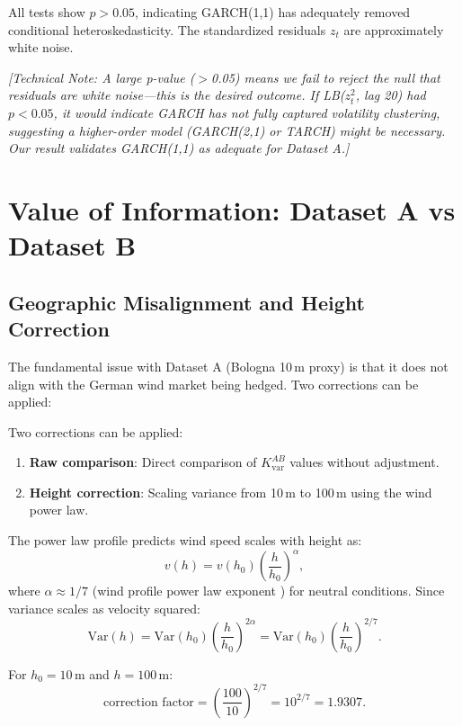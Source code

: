 \documentclass[11pt, a4paper, twoside]{article}
\begin{document}
All tests show $p > 0.05$, indicating GARCH(1,1) has adequately removed conditional heteroskedasticity. The standardized residuals $z_t$ are approximately white noise.

\textit{[Technical Note: A large p-value ($>$0.05) means we fail to reject the null that residuals are white noise---this is the desired outcome. If LB($z_t^2$, lag 20) had $p < 0.05$, it would indicate GARCH has not fully captured volatility clustering, suggesting a higher-order model (GARCH(2,1) or TARCH) might be necessary. Our result validates GARCH(1,1) as adequate for Dataset A.]}

\section{Value of Information: Dataset A vs Dataset B}

\subsection{Geographic Misalignment and Height Correction}

The fundamental issue with Dataset A (Bologna 10\,m proxy) is that it does not align with the German wind market being hedged. Two corrections can be applied:

Two corrections can be applied:

\begin{enumerate}
    \item \textbf{Raw comparison}: Direct comparison of
    $K_{\mathrm{var}}^{AB}$ values without adjustment.

    \item \textbf{Height correction}: Scaling variance from
    10\,m to 100\,m using the wind power law.
\end{enumerate}
The power law profile predicts wind speed scales with height as:
\begin{equation}
v(h) = v(h_0) \left( \frac{h}{h_0} \right)^{\alpha},
\end{equation}
where $\alpha \approx 1/7$ (wind profile power law exponent \citep{PetersonHennessey:1978}) for neutral conditions. Since variance scales as velocity squared:
\begin{equation}
\text{Var}(h) = \text{Var}(h_0) \left( \frac{h}{h_0} \right)^{2\alpha} = \text{Var}(h_0) \left( \frac{h}{h_0} \right)^{2/7}.
\end{equation}

For $h_0 = 10$\,m and $h = 100$\,m:
\begin{equation}
\text{correction factor} = \left( \frac{100}{10} \right)^{2/7} = 10^{2/7} = 1.9307.
\end{equation}
\end{document}
